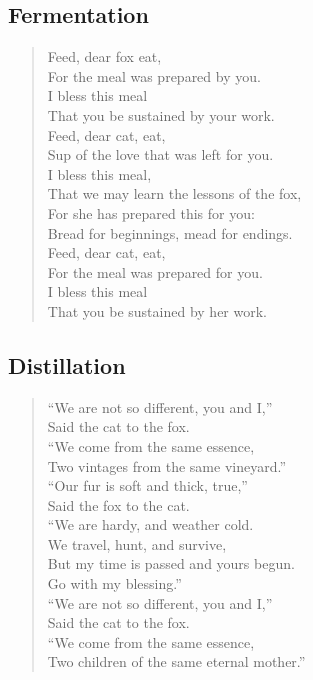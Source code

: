 \subsection{Fermentation}

\begin{verse}
Feed, dear fox eat,\\
\vin For the meal was prepared by you.\\
I bless this meal\\
\vin That you be sustained by your work.\\
Feed, dear cat, eat,\\
\vin Sup of the love that was left for you.\\
I bless this meal,\\
\vin That we may learn the lessons of the fox,\\
For she has prepared this for you:\\
\vin Bread for beginnings, mead for endings.\\
Feed, dear cat, eat,\\
\vin For the meal was prepared for you.\\
I bless this meal\\
\vin That you be sustained by her work.\\
\end{verse}
\newpage

\subsection{Distillation}

\begin{verse}
“We are not so different, you and I,”\\
\vin Said the cat to the fox.\\
“We come from the same essence,\\
\vin Two vintages from the same vineyard.”\\
“Our fur is soft and thick, true,”\\
\vin Said the fox to the cat.\\
“We are hardy, and weather cold.\\
\vin We travel, hunt, and survive,\\
But my time is passed and yours begun.\\
\vin Go with my blessing.”\\
“We are not so different, you and I,”\\
\vin Said the cat to the fox.\\
“We come from the same essence,\\
\vin Two children of the same eternal mother.”\\
\end{verse}
\newpage

